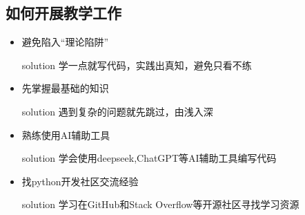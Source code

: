 \documentclass{beamer}
\begin{document}
\subsection{如何开展教学工作}

\begin{frame}[t]
	\begin{itemize}
		\item<1-> 避免陷入“理论陷阱”
		      \pause
		      \begin{alertblock}{solution}
			      学一点就写代码，实践出真知，避免只看不练
		      \end{alertblock}
		      \pause
		\item<2-> 先掌握最基础的知识
		      \pause
		      \begin{alertblock}{solution}
			      遇到复杂的问题就先跳过，由浅入深
		      \end{alertblock}
		      \pause
		\item<3-> 熟练使用AI辅助工具
		      \pause
		      \begin{alertblock}{solution}
			      学会使用deepseek,ChatGPT等AI辅助工具编写代码
		      \end{alertblock}
		      \pause
		\item<4-> 找python开发社区交流经验
		      \pause
		      \begin{alertblock}{solution}
			      学习在GitHub和Stack Overflow等开源社区寻找学习资源
		      \end{alertblock}



	\end{itemize}

\end{frame}
\end{document}
